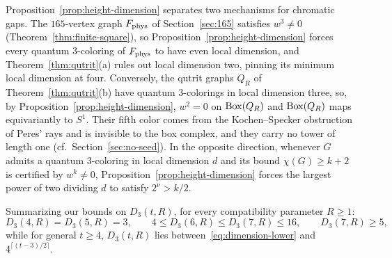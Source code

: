 Proposition~\ref{prop:height-dimension} separates two mechanisms for chromatic gaps. The $165$-vertex graph $F_{\rm phys}$ of Section~\ref{sec:165} satisfies $w^3\ne0$ (Theorem~\ref{thm:finite-square}), so Proposition~\ref{prop:height-dimension} forces every quantum $3$-coloring of $F_{\rm phys}$ to have even local dimension, and Theorem~\ref{thm:qutrit}(a) rules out local dimension two, pinning its minimum local dimension at four. Conversely, the qutrit graphs $Q_R$ of Theorem~\ref{thm:qutrit}(b) have quantum $3$-colorings in local dimension three, so, by Proposition~\ref{prop:height-dimension}, $w^2=0$ on $\operatorname{Box}(Q_R)$ and $\operatorname{Box}(Q_R)$ maps equivariantly to $S^1$. Their fifth color comes from the Kochen--Specker obstruction of Peres' rays and is invisible to the box complex, and they carry no tower of length one (cf.\ Section~\ref{sec:no-seed}). In the opposite direction, whenever $G$ admits a quantum $3$-coloring in local dimension $d$ and its bound $\chi(G)\ge k+2$ is certified by $w^k\ne0$, Proposition~\ref{prop:height-dimension} forces the largest power of two dividing $d$ to satisfy $2^\nu>k/2$.

Summarizing our bounds on $D_3(t,R)$, for every compatibility parameter $R\ge1$:
\[
 D_3(4,R)=D_3(5,R)=3,\qquad 4\le D_3(6,R)\le D_3(7,R)\le16,\qquad D_3(7,R)\ge5,
\]
while for general $t\ge4$, $D_3(t,R)$ lies between~\eqref{eq:dimension-lower} and $4^{\lceil(t-3)/2\rceil}$.
